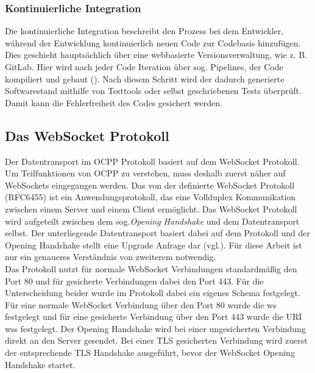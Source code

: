 \subsubsection{Kontinuierliche Integration}
Die kontinuierliche Integration beschreibt den Prozess bei dem Entwickler, während der Entwicklung kontinuierlich neuen Code zur Codebasis hinzufügen. Dies geschieht hauptsächlich über eine webbasierte Versionsverwaltung, wie z. B. GitLab. Hier wird nach jeder Code Iteration über sog. Pipelines, der Code kompiliert und gebaut (\cite{Quelle_kontinuierliche_Integration}). Nach diesem Schritt wird der dadurch generierte Softwarestand mithilfe von Testtools oder selbst geschriebenen Tests überprüft. Damit kann die Fehlerfreiheit des Codes gesichert werden.
\label{WebSockets}
\subsection{Das WebSocket Protokoll}
Der Datentransport im OCPP Protokoll basiert auf dem WebSocket Protokoll. Um Teilfunktionen von OCPP zu verstehen, muss deshalb zuerst näher auf WebSockets eingegangen werden. Das von der  definierte WebSocket Protokoll (RFC6455\cite{rfc6455}) ist ein Anwendungsprotokoll, das eine Vollduplex Kommunikation zwischen einem Server und einem Client ermöglicht. Das WebSocket Protokoll wird aufgeteilt zwischen dem sog.\textit{Opening Handshake} und dem Datentransport selbst. Der unterliegende Datentransport basiert dabei auf dem  Protokoll und der Opening Handshake stellt eine  Upgrade Anfrage dar (vgl.\cite{rfc6455}). Für diese Arbeit ist nur ein genaueres Verständnis von zweiterem notwendig. \\

\noindent Das Protokoll nutzt für normale WebSocket Verbindungen standardmäßig den Port 80 und für  gesicherte Verbindungen dabei den Port 443. Für die Unterscheidung beider wurde im Protokoll dabei ein eigenes Schema festgelegt. Für eine normale WebSocket Verbindung über den Port 80 wurde die  \glqq{}ws\grqq{} festgelegt und für eine gesicherte Verbindung über den Port 443 wurde die \acs{URI} \glqq{}wss\grqq{} festgelegt. Der Opening Handshake wird bei einer ungesicherten Verbindung direkt an den Server gesendet. Bei einer \acs{TLS} gesicherten Verbindung wird zuerst der entsprechende \acs{TLS} Handshake ausgeführt, bevor der WebSocket Opening Handshake startet.\\

